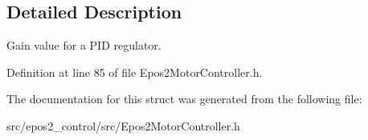 \subsection{Detailed Description}
Gain value for a P\-I\-D regulator. 

Definition at line 85 of file Epos2\-Motor\-Controller.\-h.



The documentation for this struct was generated from the following file\-:\begin{DoxyCompactItemize}
\item 
src/epos2\-\_\-control/src/Epos2\-Motor\-Controller.\-h\end{DoxyCompactItemize}
